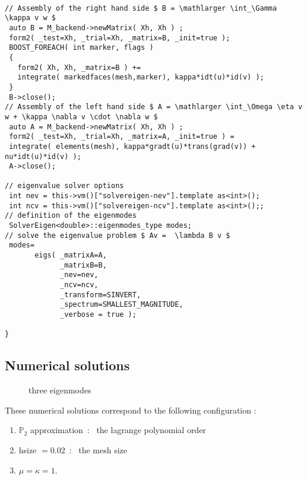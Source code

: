 \begin{lstlisting}

// Assembly of the right hand side $ B = \mathlarger \int_\Gamma \kappa v w $
 auto B = M_backend->newMatrix( Xh, Xh ) ;
 form2( _test=Xh, _trial=Xh, _matrix=B, _init=true );
 BOOST_FOREACH( int marker, flags )
 {
   form2( Xh, Xh, _matrix=B ) +=
   integrate( markedfaces(mesh,marker), kappa*idt(u)*id(v) );
 }
 B->close();
// Assembly of the left hand side $ A = \mathlarger \int_\Omega \eta v w + \kappa \nabla v \cdot \nabla w $
 auto A = M_backend->newMatrix( Xh, Xh ) ;
 form2( _test=Xh, _trial=Xh, _matrix=A, _init=true ) =
 integrate( elements(mesh), kappa*gradt(u)*trans(grad(v)) + nu*idt(u)*id(v) );
 A->close();

// eigenvalue solver options
 int nev = this->vm()["solvereigen-nev"].template as<int>();
 int ncv = this->vm()["solvereigen-ncv"].template as<int>();;
// definition of the eigenmodes
 SolverEigen<double>::eigenmodes_type modes;
// solve the eigenvalue problem $ Av =  \lambda B v $
 modes=
       eigs( _matrixA=A,
             _matrixB=B,
             _nev=nev,
             _ncv=ncv,
             _transform=SINVERT,
             _spectrum=SMALLEST_MAGNITUDE,
             _verbose = true );

}

\end{lstlisting}

\subsection{Numerical solutions}
\label{sec:numerical-solutions-1}
\vspace{-17pt}
\begin{figure}[htbp]
  \centering
  \hspace{0.3cm}
  \hspace{0.3cm}
  \caption{three eigenmodes}
\label{fig:eigenvalues}
\end{figure}
These numerical solutions correspond to the following configuration :
\begin{enumerate}
\item $\mathbb P_2$ approximation~:~ the lagrange polynomial order
\item hsize $= 0.02$~:~ the mesh size
\item $\mu = \kappa = 1.$
\end{enumerate}
